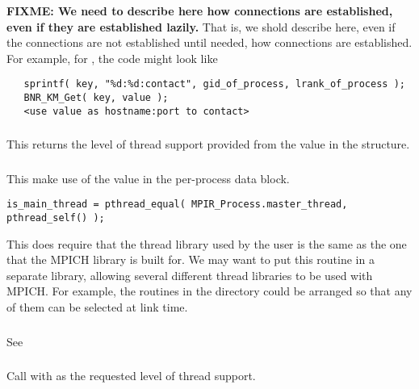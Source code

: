 \documentclass{article}
\def\fixme#1{\marginpar{FIXME:}\textbf{FIXME: #1}}
\begin{document}

\fixme{We need to describe here how connections are established, even if
they are established lazily.}  That is, we shold describe here, even if the
connections are not established until needed, how connections are
established.  For example, for \tcpname, the code might look like
\begin{verbatim}
   sprintf( key, "%d:%d:contact", gid_of_process, lrank_of_process );
   BNR_KM_Get( key, value );
   <use value as hostname:port to contact>
\end{verbatim}

\subsubsection{}
This returns the level of thread support provided from the
 value in the 
structure. 

\subsubsection{}
This make use of the  value in the
per-process data block.

\begin{verbatim}
is_main_thread = pthread_equal( MPIR_Process.master_thread, pthread_self() );
\end{verbatim}
This does require that the thread library used by the user is the same as the
one that the MPICH library is built for.  We may want to put this routine in a
separate library, allowing several different thread libraries to be used with
MPICH.  For example, the routines in the  directory could be
arranged so that any of them can be selected at link time.

\subsubsection{}
See 

\subsubsection{}
Call  with  as the
requested level of thread support.
\end{document}
